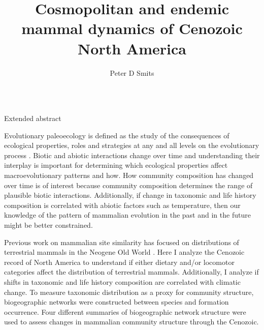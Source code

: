 \documentclass[final]{beamer}\usepackage[]{graphicx}\usepackage[]{color}
\title{Cosmopolitan and endemic mammal dynamics of Cenozoic North America}
\author{Peter D Smits}
\institute{Committee on Evolutionary Biology, University of Chicago}
\newlength{\onecolwid}
\begin{document}
\begin{frame}[t]
  \begin{columns}[t]
    \begin{column}{\onecolwid}
    \begin{block}{Extended abstract}
%

  \alert{Evolutionary paleoecology is defined as the study of the consequences of ecological properties, roles and strategies at any and all levels on the evolutionary process \citep{Kitchell1985a}.} Biotic and abiotic interactions change over time and understanding their interplay is important for determining which ecological properties affect macroevolutionary patterns and how.
  \alert{How community composition has changed over time is of interest because community composition determines the range of plausible biotic interactions.} Additionally, if change in taxonomic and life history composition is correlated with abiotic factors such as temperature, then our knowledge of the pattern of mammalian evolution in the past and in the future might be better constrained.

        Previous work on mammalian site similarity has focused on distributions of terrestrial mammals in the Neogene Old World \citep{Jernvall2002,Jernvall2004}. 
        \alert{Here I analyze the Cenozoic record of North America to understand if either dietary and/or locomotor categories affect the distribution of terrestrial mammals. Additionally, I analyze if shifts in taxonomic and life history composition are correlated with climatic change.}
        To measure taxonomic distribution as a proxy for community structure, biogeographic networks were constructed between species and formation occurrence. Four different summaries of biogeographic network structure were used to assess changes in mammalian community structure through the Cenozoic.
      \end{block}


\end{column}
\end{columns}
\end{frame}
\end{document}
